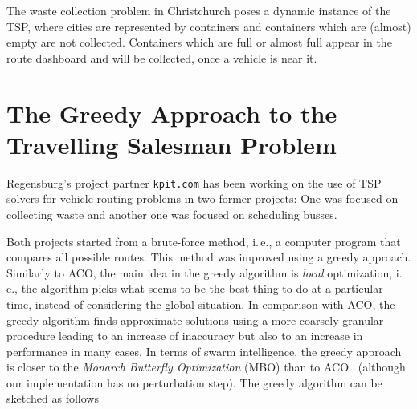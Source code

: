 \documentclass[10pt]{article}
\begin{document}
The waste collection problem in Christchurch poses a dynamic instance of the TSP, where cities are represented by containers and containers which are (almost) empty are not collected. Containers which are full or almost full appear in the route dashboard and 
will be collected, once a vehicle is near it.

\section{The Greedy Approach to the Travelling Salesman Problem}
\label{sec:kpit}

Regensburg's project partner {\tt kpit.com} has been working on the use of TSP solvers
for vehicle routing problems in two former projects: One was focused on collecting 
waste and another one was focused on scheduling busses.

Both projects started from a brute-force method, i.\,e., a computer program that
compares all possible routes. This method was improved using a greedy approach.
Similarly to ACO, the main idea in the greedy algorithm is {\it local} optimization,
i.\,e., the algorithm picks what seems to be the best thing to do at a particular time, instead of considering the global situation. In comparison with ACO,
the greedy algorithm finds approximate solutions using a more coarsely granular
procedure leading to an increase of inaccuracy but also to an increase in performance
in many cases. 
In terms of swarm intelligence, the greedy approach is closer to the {\it Monarch
Butterfly Optimization} (MBO) than to ACO~\cite{chen17} (although our implementation
has no perturbation step). 
The greedy algorithm can be sketched as follows
\end{document}
